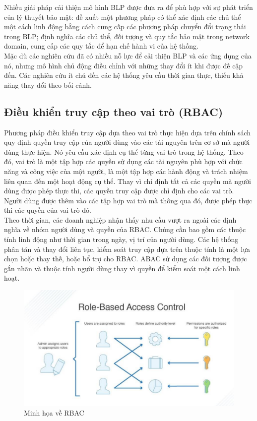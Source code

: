 Nhiều giải pháp cải thiện mô hình BLP được đưa ra để phù hợp với sự phát triển
của lý thuyết bảo mật: đề xuất một phương pháp có thể xác định các chủ thể một cách
linh động bằng cách cung cấp các phương pháp chuyển đổi trạng thái trong BLP; định nghĩa các chủ thể, đối tượng và quy tắc bảo mật trong network domain, cung cấp
các quy tắc để hạn chế hành vi của hệ thống. \\

Mặc dù các nghiên cứu đã có nhiều nỗ lực để cải thiện BLP và các ứng dụng của
nó, nhưng mô hình chủ động điều chỉnh với những thay đổi ít khi được đề cập đến. Các
nghiên cứu ít chú đến các hệ thống yêu cầu thời gian thực, thiếu khả năng thay đổi theo
bối cảnh.
\subsection{Điều khiển truy cập theo vai trò (RBAC)}
Phương pháp điều khiển truy cập dựa theo vai trò thực hiện dựa trên chính sách
quy định quyền truy cập của người dùng vào các tài nguyên trên cơ sở mà người dùng
thực hiện. Nó yêu cầu xác định cụ thể từng vai trò trong hệ thống. Theo đó, vai trò là
một tập hợp các quyền sử dụng các tài nguyên phù hợp với chức năng và công việc của
một người, là một tập hợp các hành động và trách nhiệm liên quan đến một hoạt động
cụ thể. Thay vì chỉ định tất cả các quyền mà người dùng được phép thực thi, các quyền
truy cập được chỉ định cho các vai trò. Người dùng được thêm vào các tập hợp vai trò
mà thông qua đó, được phép thực thi các quyền của vai trò đó. \\

Theo thời gian, các doanh nghiệp nhận thấy nhu cầu vượt ra ngoài các định nghĩa
về nhóm người dùng và quyền của RBAC. Chúng cần bao gồm các thuộc tính linh động
như thời gian trong ngày, vị trí của người dùng. Các hệ thống phân tán và thay đổi liên
tục, kiểm soát truy cập dựa trên thuộc tính là một lựa chọn hoặc thay thế, hoặc bổ trợ
cho RBAC. ABAC sử dụng các đối tượng được gắn nhãn và thuộc tính người dùng thay
vì quyền để kiểm soát một cách linh hoạt.
\begin{figure}
    \centering
    \includegraphics[scale=0.7]{graphics/chapter-2/chap2-rbac.png}
    \caption{Minh họa về RBAC}
    \label{fig:enter-label}
\end{figure}
